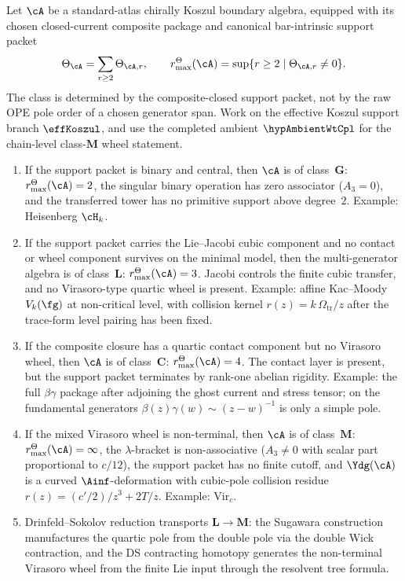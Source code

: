 \begin{proposition}%
\label{prop:pole-order-classification}%
%
%
%
Let $\cA$ be a standard-atlas chirally Koszul boundary algebra, equipped
with its chosen closed-current composite package and canonical
bar-intrinsic support packet
\[
\Theta_\cA=\sum_{r\ge2}\Theta_{\cA,r},\qquad
r^\Theta_{\max}(\cA)=
\sup\{r\ge2\mid\Theta_{\cA,r}\ne0\}.
\]
The class is determined by the composite-closed support packet, not by
the raw OPE pole order of a chosen generator span.  Work on the
effective Koszul support branch \(\effKoszul\), and use the completed
ambient \(\hypAmbientWtCpl\) for the chain-level class-\(\mathbf M\)
wheel statement.
\begin{enumerate}
\item If the support packet is binary and central, then
 $\cA$ is of class~$\mathbf{G}$:
 \(r^\Theta_{\max}(\cA)=2\), the singular binary operation has
 zero associator \textup{(}$A_3=0$\textup{)}, and the transferred
 tower has no primitive support above degree~$2$.
 \textup{Example}: Heisenberg $\cH_k$.
\item If the support packet carries the Lie--Jacobi cubic component
 and no contact or wheel component survives on the minimal model, then
 the multi-generator algebra is of class~$\mathbf{L}$:
 \(r^\Theta_{\max}(\cA)=3\).  Jacobi controls the finite cubic transfer,
 and no Virasoro-type quartic wheel is present.
 \textup{Example}: affine Kac--Moody $V_k(\fg)$ at non-critical level,
 with collision kernel \(r(z)=k\,\Omega_{\mathrm{tr}}/z\) after the trace-form level
 pairing has been fixed.
\item If the composite closure has a quartic contact component but no
 Virasoro wheel, then $\cA$ is of class~$\mathbf{C}$:
 \(r^\Theta_{\max}(\cA)=4\).  The contact layer is present, but the
 support packet terminates by rank-one abelian rigidity.
 \textup{Example}: the full $\beta\gamma$ package after adjoining the
 ghost current and stress tensor; on the fundamental generators
 $\beta(z)\gamma(w)\sim (z-w)^{-1}$ is only a simple pole.
\item If the mixed Virasoro wheel is non-terminal, then $\cA$ is
 of class~$\mathbf{M}$: \(r^\Theta_{\max}(\cA)=\infty\), the
 $\lambda$-bracket is non-associative
 \textup{(}$A_3 \neq 0$ with scalar part proportional to
 $c/12$\textup{)}, the support packet has no finite cutoff, and
 $\Ydg(\cA)$ is a curved $\Ainf$-deformation with
 cubic-pole collision residue
 $r(z) = (c'/2)/z^3 + 2T/z$.
 \textup{Example}: $\mathrm{Vir}_c$.
\item Drinfeld--Sokolov reduction transports
 $\mathbf{L} \to \mathbf{M}$: the Sugawara construction
 manufactures the quartic pole from the double pole via the
 double Wick contraction, and the DS contracting homotopy
 generates the non-terminal Virasoro wheel from the finite Lie input
 through the resolvent tree formula.
\end{enumerate}
\end{proposition}

